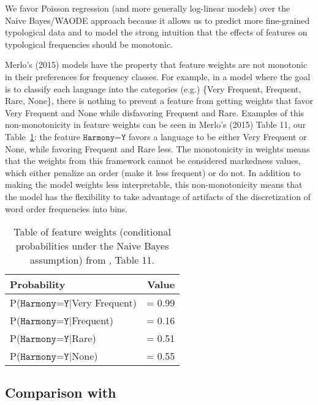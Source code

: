 \documentclass[11pt]{article}
\begin{document}
We favor Poisson regression (and more generally log-linear models) over the Naive Bayes/WAODE approach because it allows us to predict more fine-grained typological data and to model the strong intuition that the effects of features on typological frequencies should be monotonic.

Merlo's (2015) models have the property that feature weights are not monotonic in their preferences for frequency classes.
For example, in a model where the goal is to classify each language into the categories (e.g.) \{Very Frequent, Frequent, Rare, None\}, there is nothing to prevent a feature from getting weights that favor Very Frequent and None while disfavoring Frequent and Rare.
Examples of this non-monotonicity in feature weights can be seen in Merlo's (2015) Table 11, our Table~\ref{tab:merlo-table}: the feature $\texttt{Harmony=Y}$ favors a language to be either Very Frequent or None, while favoring Frequent and Rare less.
The monotonicity in weights means that the weights from this framework cannot be considered markedness values, which either penalize an order (make it less frequent) or do not.
In addition to making the model weights less interpretable, this non-monotonicity means that the model has the flexibility to take advantage of artifacts of the discretization of word order frequencies into bins.

\begin{table}
  \centering
  \begin{tabular}{|l r|}
    \hline
    Probability & Value \\
    \hline
    P($\texttt{Harmony=Y}|$Very Frequent) & = 0.99 \\
    P($\texttt{Harmony=Y}|$Frequent) & = 0.16 \\
    P($\texttt{Harmony=Y}|$Rare) & = 0.51 \\
    P($\texttt{Harmony=Y}|$None) & = 0.55 \\    
    \hline
  \end{tabular}
  \caption{Table of feature weights (conditional probabilities under the Naive Bayes assumption) from \citet{merlo2015predicting}, Table 11.}
  \label{tab:merlo-table}
\end{table}



\subsection{Comparison with \citet{cysouw2010dealing}}
\label{sec:comp-with-citetcys}
\end{document}
